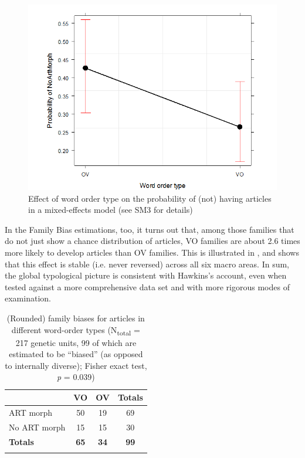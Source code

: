 \documentclass[output=paper]{langsci/langscibook}
\begin{document}
  

\begin{figure}
\includegraphics[height=.3\textheight]{figures/schmidtkebode-img2.png}
\caption{Effect of word order type on the probability of (not) having articles in a mixed-effects model (see SM3 for details)}
\label{fig:ksb:2}
\end{figure}

In the Family Bias estimations, too, it turns out that, among those families that do not just show a chance distribution of articles, VO families are about 2.6 times more likely to develop articles than OV families. This is illustrated in , and  shows that this effect is stable (i.e. never reversed) across all six macro areas. In sum, the global typological picture is consistent with Hawkins’s  account, even when tested against a more comprehensive data set and with more rigorous modes of examination.
 

\begin{table}
\begin{tabularx}{.8\textwidth}{lSSS}
\lsptoprule
& VO &   OV &   Totals\\
\midrule 
ART morph & 50 & 19 & 69\\
No ART morph & 15 & 15 & 30\\
\midrule
\textbf{Totals} & \textbf{65} & \textbf{34} & \textbf{99}\\
\lspbottomrule
\end{tabularx} 
\caption{(Rounded) family biases for articles in different word-order types (N\textsubscript{total} = 217 genetic units, 99 of which are estimated to be “biased” (as opposed to internally diverse); Fisher exact test, \textit{p} = 0.039)}
\label{tab:ksb:3}
\end{table}
   
\end{document}
